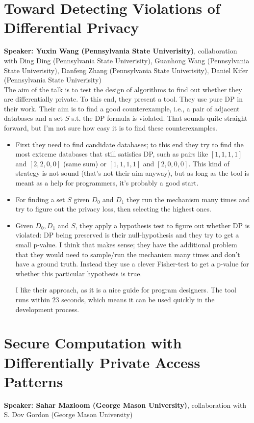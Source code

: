 \documentclass{article}
\begin{document}
\section{Toward Detecting Violations of Differential Privacy}
\noindent\textbf{Speaker: Yuxin Wang (Pennsylvania State Univerisity)}, collaboration with Ding Ding (Pennsylvania State Univerisity), Guanhong Wang (Pennsylvania State Univerisity), Danfeng Zhang (Pennsylvania State Univerisity), Daniel Kifer (Pennsylvania State Univerisity)\\

The aim of the talk is to test the design of algorithms to find out whether they are differentially private. To this end, they present a tool. They use pure DP in their work. Their aim is to find a good counterexample, i.e., a pair of adjacent databases and a set $S$ s.t. the DP formula is violated. That sounds quite straight-forward, but I'm not sure how easy it is to find these counterexamples.

\begin{itemize}
	\item First they need to find candidate databases; to this end they try to find the most extreme databases that still satisfies DP, such as pairs like $[1,1,1,1]$ and $[2,2,0,0]$ (same sum) or $[1,1,1,1]$ and $[2,0,0,0]$. This kind of strategy is not sound (that's not their aim anyway), but as long as the tool is meant as a help for programmers, it's probably a good start.
	\item For finding a set $S$ given $D_0$ and $D_1$ they run the mechanism many times and try to figure out the privacy loss, then selecting the highest ones.
	\item Given $D_0, D_1$ and $S$, they apply a hypothesis test to figure out whether DP is violated: DP being preserved is their null-hypothesis and they try to get a small p-value. I think that makes sense; they have the additional problem that they would need to sample/run the mechanism many times and don't have a ground truth. Instead they use a clever Fisher-test to get a p-value for whether this particular hypothesis is true.

I like their approach, as it is a nice guide for program designers. The tool runs within 23 seconds, which means it can be used quickly in the development process.

\end{itemize}


\section{Secure Computation with Differentially Private Access Patterns}
\noindent\textbf{Speaker: Sahar Mazloom (George Mason University)}, collaboration with S. Dov Gordon (George Mason University)\\
\end{document}
